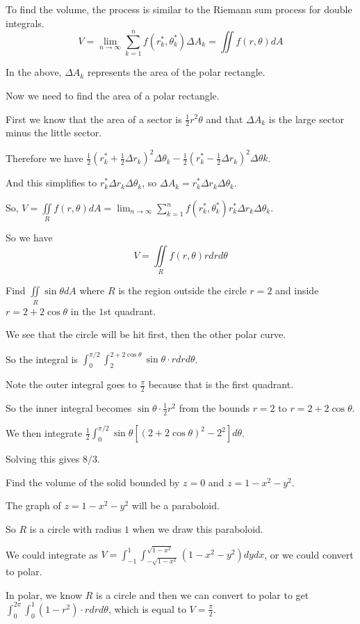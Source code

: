 \documentclass[../calc3.tex]{subfiles}
\begin{document}
To find the volume, the process is similar to the Riemann sum process for double integrals.
\[ V = \lim_{n\to\infty}\sum_{k=1}^n f(r_k^*, \theta_k^*)\Delta A_k = \iint f(r,\theta)dA \]

In the above, $\Delta A_k$ represents the area of the polar rectangle. 

Now we need to find the area of a polar rectangle.

First we know that the area of a sector is $\frac{1}{2}r^2\theta$ and that $\Delta A_k$ is the large sector minus the little sector.

Therefore we have $\frac{1}{2}\left(r_k^*+\frac{1}{2}\Delta r_k\right)^2\Delta \theta_k - \frac{1}{2}\left(r_k^* - \frac{1}{2}\Delta r_k\right)^2\Delta \theta k$.

And this simplifies to $r_k^* \Delta r_k \Delta \theta_k$, so $\Delta A_k = r_k^*\Delta r_k\Delta \theta_k$.

So, $V=\iint\limits_{R} f(r,\theta)dA=\lim_{n\to\infty}\sum_{k=1}^n f(r_k^*, \theta_k^*)r_k^* \Delta r_k\Delta \theta_k$.

So we have 
\[ V = \iint\limits_{R} f(r,\theta)rdrd\theta\]

\pagebreak
\begin{example}
    Find $\iint\limits_{R} \sin\theta dA$ where $R$ is the region outside the circle $r=2$ and inside $r=2+2\cos\theta$ in the $1$st quadrant.

    We see that the circle will be hit first, then the other polar curve.

    So the integral is $\int_0^{\pi/2}\int_2^{2+2\cos\theta}\sin\theta\cdot rdrd\theta$.

    Note the outer integral goes to $\frac{\pi}{2}$ because that is the first quadrant.

    So the inner integral becomes $\sin\theta \cdot \frac{1}{2}r^2$ from the bounds $r=2$ to $r=2+2\cos\theta$.

    We then integrate $\frac{1}{2}\int_0^{\pi/2}\sin\theta [(2+2\cos\theta)^2-2^2]d\theta$.

    Solving this gives $8/3$.
\end{example}

\begin{example}
    Find the volume of the solid bounded by $z=0$ and $z=1-x^2-y^2$.

    The graph of $z=1-x^2-y^2$ will be a paraboloid.

    So $R$ is a circle with radius $1$ when we draw this paraboloid.

    We could integrate as $V=\int_{-1}^1 \int_{-\sqrt{1-x^2}}^{\sqrt{1-x^2}}(1-x^2-y^2)dydx$, or we could convert to polar.

    In polar, we know $R$ is a circle and then we can convert to polar to get $\int_0^{2\pi}\int_0^1 (1-r^2)\cdot r drd\theta$, which is equal to $V=\frac{\pi}{2}$.
\end{example}
\end{document}
